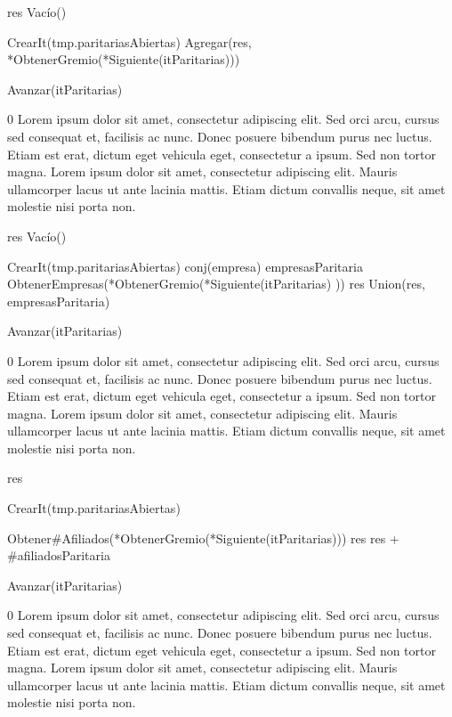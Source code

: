 {
	\state res \asig Vacío()		
	\state

	\state {} \asig CrearIt(tmp.paritariasAbiertas)		
											
		\state
		\state Agregar(res, *ObtenerGremio(*Siguiente(itParitarias)))		
		
		\state
		\state Avanzar(itParitarias)										
	\endwhile
}
{0}
{Lorem ipsum dolor sit amet, consectetur adipiscing elit. Sed orci arcu, cursus sed consequat et, facilisis ac nunc. Donec posuere bibendum purus nec luctus. Etiam est erat, dictum eget vehicula eget, consectetur a ipsum. Sed non tortor magna. Lorem ipsum dolor sit amet, consectetur adipiscing elit. Mauris ullamcorper lacus ut ante lacinia mattis. Etiam dictum convallis neque, sit amet molestie nisi porta non.}

{
	\state res \asig Vacío()		
	\state

	\state {} \asig CrearIt(tmp.paritariasAbiertas)		
							
		\state
		\state conj(empresa) empresasParitaria \asig ObtenerEmpresas(*ObtenerGremio(*Siguiente(itParitarias)		))
		\state res \asig Union(res, empresasParitaria)		

		\state
		\state Avanzar(itParitarias)						
	\endwhile
}
{0}
{Lorem ipsum dolor sit amet, consectetur adipiscing elit. Sed orci arcu, cursus sed consequat et, facilisis ac nunc. Donec posuere bibendum purus nec luctus. Etiam est erat, dictum eget vehicula eget, consectetur a ipsum. Sed non tortor magna. Lorem ipsum dolor sit amet, consectetur adipiscing elit. Mauris ullamcorper lacus ut ante lacinia mattis. Etiam dictum convallis neque, sit amet molestie nisi porta non.}

{
	\state res 		
	\state

	\state {} \asig CrearIt(tmp.paritariasAbiertas)		
						
		\state

		\state {} \asig Obtener\#Afiliados(*ObtenerGremio(*Siguiente(itParitarias)))		
		\state res \asig res + \#afiliadosParitaria		

		\state
		\state Avanzar(itParitarias)					
	\endwhile
}
{0}
{Lorem ipsum dolor sit amet, consectetur adipiscing elit. Sed orci arcu, cursus sed consequat et, facilisis ac nunc. Donec posuere bibendum purus nec luctus. Etiam est erat, dictum eget vehicula eget, consectetur a ipsum. Sed non tortor magna. Lorem ipsum dolor sit amet, consectetur adipiscing elit. Mauris ullamcorper lacus ut ante lacinia mattis. Etiam dictum convallis neque, sit amet molestie nisi porta non.}

